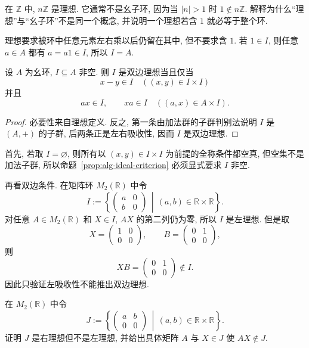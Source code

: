 \documentclass[usesamecnt, thmcnt=section, lang=cn, newtx, 10pt, scheme=chinese]{elegantbook}
\begin{document}
\begin{concept}\label{con:alg-ideal-01}
在 $\mathbb Z$ 中, $n\mathbb Z$ 是理想. 它通常不是幺子环, 因为当 $|n|>1$ 时 $1\notin n\mathbb Z$. 解释为什么``理想''与``幺子环''不是同一个概念, 并说明一个理想若含 $1$ 就必等于整个环.
\end{concept}

\begin{solution}
理想要求被环中任意元素左右乘以后仍留在其中, 但不要求含 $1$. 若 $1\in I$, 则任意 $a\in A$ 都有 $a=a1\in I$, 所以 $I=A$.
\end{solution}

\begin{proposition}\label{prop:alg-ideal-criterion}
设 $A$ 为幺环, $I\subseteq A$ 非空. 则 $I$ 是双边理想当且仅当
\[
 x-y\in I\quad((x,y)\in I\times I)
\]
并且
\[
 ax\in I,\qquad xa\in I\quad((a,x)\in A\times I).
\]
\end{proposition}

\begin{proof}
必要性来自理想定义. 反之, 第一条由加法群的子群判别法说明 $I$ 是 $(A,+)$ 的子群, 后两条正是左右吸收性, 因而 $I$ 是双边理想.
\end{proof}

\begin{instance}
首先, 若取 $I=\varnothing$, 则所有以 $(x,y)\in I\times I$ 为前提的全称条件都空真, 但空集不是加法子群, 所以命题~\ref{prop:alg-ideal-criterion} 必须显式要求 $I$ 非空.

再看双边条件. 在矩阵环 $M_2(\mathbb R)$ 中令
\[
 I:=\left\{
 \begin{pmatrix}a&0\\ b&0\end{pmatrix}
 \,\middle|\,(a,b)\in\mathbb R\times\mathbb R
 \right\}.
\]
对任意 $A\in M_2(\mathbb R)$ 和 $X\in I$, $AX$ 的第二列仍为零, 所以 $I$ 是左理想. 但是取
\[
 X=\begin{pmatrix}1&0\\0&0\end{pmatrix},
 \qquad
 B=\begin{pmatrix}0&1\\0&0\end{pmatrix},
\]
则
\[
 XB=\begin{pmatrix}0&1\\0&0\end{pmatrix}\notin I.
\]
因此只验证左吸收性不能推出双边理想.
\end{instance}

\begin{exercise}\label{ex:alg-ideal-nonempty}
在 $M_2(\mathbb R)$ 中令
\[
 J:=\left\{
 \begin{pmatrix}a&b\\0&0\end{pmatrix}
 \,\middle|\,(a,b)\in\mathbb R\times\mathbb R
 \right\}.
\]
证明 $J$ 是右理想但不是左理想, 并给出具体矩阵 $A$ 与 $X\in J$ 使 $AX\notin J$.
\end{exercise}
\end{document}
